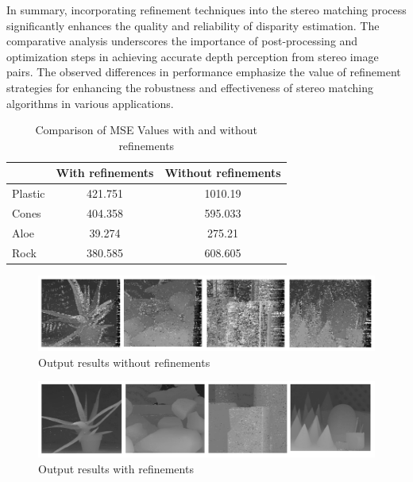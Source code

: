 \documentclass{article}
\begin{document}
In summary, incorporating refinement techniques into the stereo matching process significantly enhances the quality and reliability of disparity estimation. The comparative analysis underscores the importance of post-processing and optimization steps in achieving accurate depth perception from stereo image pairs.
The observed differences in performance emphasize the value of refinement strategies for enhancing the robustness and effectiveness of stereo matching algorithms in various applications.



\begin{table}[h]
    \centering
    \caption{Comparison of MSE Values with and without refinements}
    \begin{tabular}{lcc}
        \toprule
        \textbf{} & \textbf{With refinements} & \textbf{Without refinements} \\
        \midrule
        Plastic & 421.751 & 1010.19 \\
        Cones & 404.358 & 595.033 \\
        Aloe & 39.274 & 275.21 \\
        Rock & 380.585 & 608.605 \\
        \bottomrule
    \end{tabular}
    \label{tab:comparison}
\end{table}



\begin{figure}[h]
    \centering
    \includegraphics[width=\textwidth]{without_refinements.png}
    \caption{Output results without refinements}
    \label{fig:without_refinements}
\end{figure}

\begin{figure}[h]
    \centering
    \includegraphics[width=\textwidth]{with_refinements.png}
    \caption{Output results with refinements}
        \label{fig:with_refinements}
\end{figure}
\end{document}
